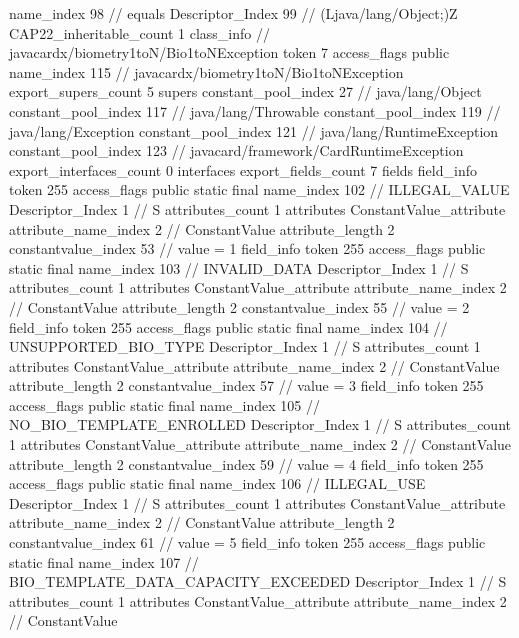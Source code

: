 {{{{{					name_index	98		// equals
					Descriptor_Index	99		// (Ljava/lang/Object;)Z
				}
			}
			CAP22_inheritable_count	1
		}
		class_info {		// javacardx/biometry1toN/Bio1toNException
			token	7
			access_flags	public
			name_index	115		// javacardx/biometry1toN/Bio1toNException
			export_supers_count	5
			supers {
				constant_pool_index	27		// java/lang/Object
				constant_pool_index	117		// java/lang/Throwable
				constant_pool_index	119		// java/lang/Exception
				constant_pool_index	121		// java/lang/RuntimeException
				constant_pool_index	123		// javacard/framework/CardRuntimeException
			}
			export_interfaces_count	0
			interfaces {
			}
			export_fields_count	7
			fields {
			field_info {
				token	255
				access_flags	public static final
				name_index	102		// ILLEGAL_VALUE
				Descriptor_Index	1		// S
				attributes_count	1
				attributes {
				ConstantValue_attribute {
					attribute_name_index	2		// ConstantValue
					attribute_length	2
					constantvalue_index	53		// value = 1
				}
				}
			}
			field_info {
				token	255
				access_flags	public static final
				name_index	103		// INVALID_DATA
				Descriptor_Index	1		// S
				attributes_count	1
				attributes {
				ConstantValue_attribute {
					attribute_name_index	2		// ConstantValue
					attribute_length	2
					constantvalue_index	55		// value = 2
				}
				}
			}
			field_info {
				token	255
				access_flags	public static final
				name_index	104		// UNSUPPORTED_BIO_TYPE
				Descriptor_Index	1		// S
				attributes_count	1
				attributes {
				ConstantValue_attribute {
					attribute_name_index	2		// ConstantValue
					attribute_length	2
					constantvalue_index	57		// value = 3
				}
				}
			}
			field_info {
				token	255
				access_flags	public static final
				name_index	105		// NO_BIO_TEMPLATE_ENROLLED
				Descriptor_Index	1		// S
				attributes_count	1
				attributes {
				ConstantValue_attribute {
					attribute_name_index	2		// ConstantValue
					attribute_length	2
					constantvalue_index	59		// value = 4
				}
				}
			}
			field_info {
				token	255
				access_flags	public static final
				name_index	106		// ILLEGAL_USE
				Descriptor_Index	1		// S
				attributes_count	1
				attributes {
				ConstantValue_attribute {
					attribute_name_index	2		// ConstantValue
					attribute_length	2
					constantvalue_index	61		// value = 5
				}
				}
			}
			field_info {
				token	255
				access_flags	public static final
				name_index	107		// BIO_TEMPLATE_DATA_CAPACITY_EXCEEDED
				Descriptor_Index	1		// S
				attributes_count	1
				attributes {
				ConstantValue_attribute {
					attribute_name_index	2		// ConstantValue
}}}}}}}
